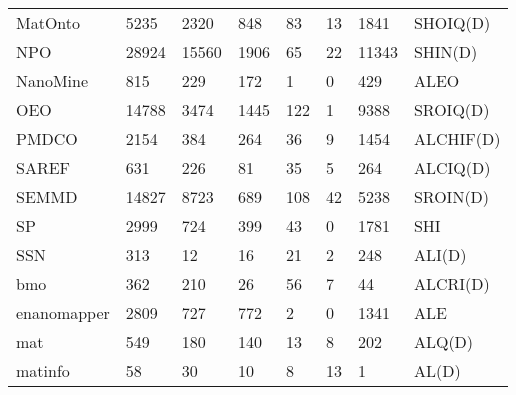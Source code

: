\begin{table}
\begin{tabular}{m{3.5cm}m{1cm}m{1cm}m{1cm}m{1cm}m{1cm}m{1cm}m{1cm}}
MatOnto                 &      5235 &              2320 &        848 &                   83 &                     13 &                     1841 &         SHOIQ(D) \\
NPO                     &     28924 &             15560 &       1906 &                   65 &                     22 &                    11343 &          SHIN(D) \\
NanoMine                &       815 &               229 &        172 &                    1 &                      0 &                      429 &             ALEO \\
OEO                     &     14788 &              3474 &       1445 &                  122 &                      1 &                     9388 &         SROIQ(D) \\
PMDCO                   &      2154 &               384 &        264 &                   36 &                      9 &                     1454 &        ALCHIF(D) \\
SAREF                   &       631 &               226 &         81 &                   35 &                      5 &                      264 &         ALCIQ(D) \\
SEMMD                   &     14827 &              8723 &        689 &                  108 &                     42 &                     5238 &         SROIN(D) \\
SP                      &      2999 &               724 &        399 &                   43 &                      0 &                     1781 &              SHI \\
SSN                     &       313 &                12 &         16 &                   21 &                      2 &                      248 &           ALI(D) \\
bmo                     &       362 &               210 &         26 &                   56 &                      7 &                       44 &         ALCRI(D) \\
enanomapper             &      2809 &               727 &        772 &                    2 &                      0 &                     1341 &              ALE \\
mat                     &       549 &               180 &        140 &                   13 &                      8 &                      202 &           ALQ(D) \\
matinfo                 &        58 &                30 &         10 &                    8 &                     13 &                        1 &            AL(D) \\

\end{tabular}
\end{table}
